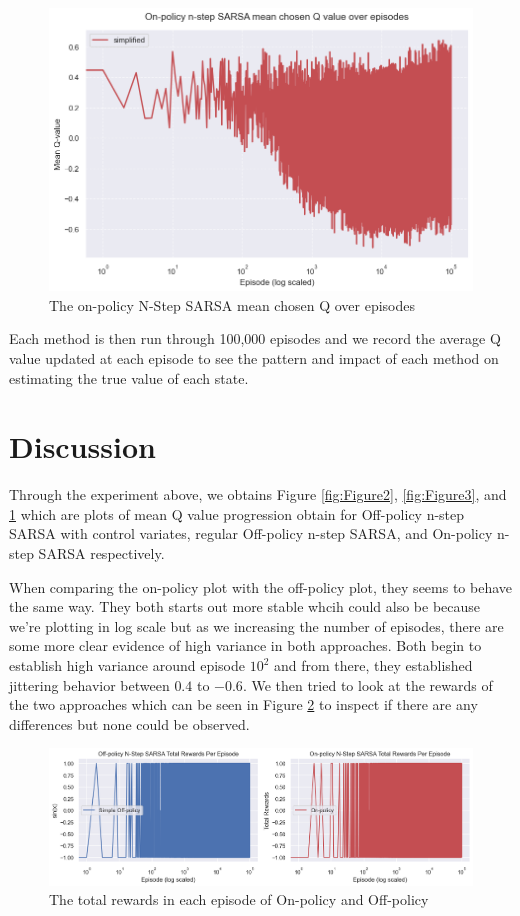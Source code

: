 \documentclass{article}
\begin{document}
\begin{figure}[!ht]
	\centering
	\includegraphics[scale=0.50]{./images/Figure 4.png}
	\caption{The on-policy N-Step SARSA mean chosen Q over
  episodes}
	\label{fig:Figure4}
\end{figure}

Each method is then run through 100,000 episodes and we record the average Q value
updated at each episode to see the pattern and impact of each method on
estimating the true value of each state. 

\section{Discussion}
Through the experiment above, we obtains Figure
\ref{fig:Figure2},
\ref{fig:Figure3}, and
\ref{fig:Figure4} which are
plots of mean Q value progression obtain for Off-policy n-step SARSA with control variates, regular
Off-policy n-step SARSA, and On-policy n-step SARSA respectively.

When comparing the on-policy plot with the off-policy plot, they seems to behave
the same way. They both starts out more stable whcih could also be because we're
plotting in log scale but as we increasing the number of episodes, there are
some more clear evidence of high variance in both approaches. Both begin to
establish high variance around  episode $10^2$ and from there, they established
jittering behavior between $0.4$ to $-0.6$. We then tried to look at the rewards
of the two approaches which can be seen in Figure \ref{fig:Figure7}
to inspect if there are any differences but none could be observed.

\begin{figure}[!ht]
	\centering
	\includegraphics[scale=0.50]{./images/Figure 7.png}
	\caption{The total rewards in each episode of On-policy and Off-policy}
	\label{fig:Figure7}
\end{figure}
\end{document}
